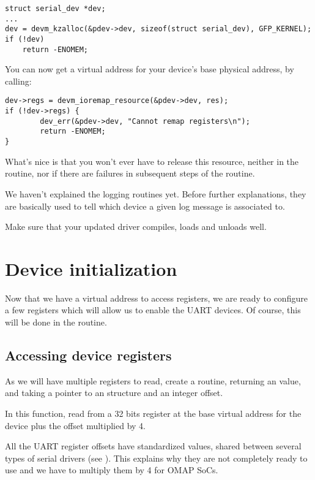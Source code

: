 \begin{verbatim}
struct serial_dev *dev;
...
dev = devm_kzalloc(&pdev->dev, sizeof(struct serial_dev), GFP_KERNEL);
if (!dev)
	return -ENOMEM;
\end{verbatim}

You can now get a virtual address for your device's base physical
address, by calling:

\begin{verbatim}
dev->regs = devm_ioremap_resource(&pdev->dev, res);
if (!dev->regs) {
        dev_err(&pdev->dev, "Cannot remap registers\n");
        return -ENOMEM;
}
\end{verbatim}

What's nice is that you won't ever have to release this resource,
neither in the  routine, nor if there are failures
in subsequent steps of the  routine.

We haven't explained the  logging routines yet.
Before further explanations, they are basically used to tell which
device a given log message is associated to. 

Make sure that your updated driver compiles, loads and unloads well.

\section{Device initialization}

Now that we have a virtual address to access registers, we are ready to
configure a few registers which will allow us to enable the UART
devices. Of course, this will be done in the  routine.

\subsection{Accessing device registers}

As we will have multiple registers to read, create a 
routine, returning an  value, and  taking a 
pointer to an  structure and an  integer
offset.

In this function, read from a 32 bits register at the base virtual
address for the device plus the offset multiplied by 4.

All the UART register offsets have standardized values, shared between
several types of serial drivers (see
). This explains why they are not
completely ready to use and we have to multiply them by 4 for OMAP SoCs.

